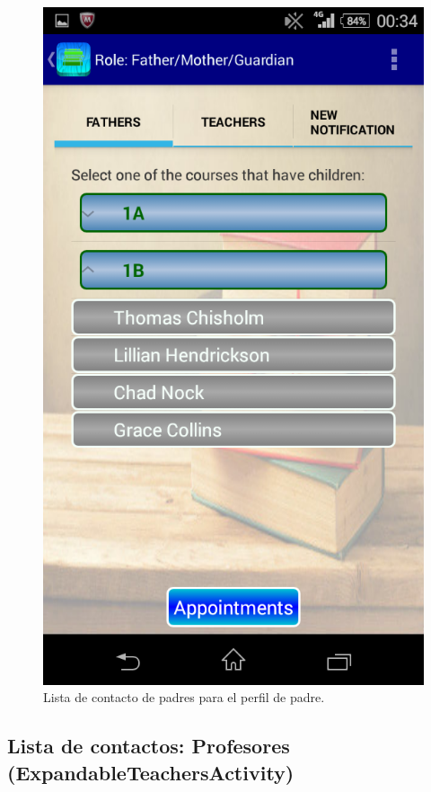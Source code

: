 			\begin{figure}[h !]
				\centering
				\includegraphics[scale=0.2]{Imagenes/App/padrePadre}
				\caption{Lista de contacto de padres para el perfil de padre.}
				\label{fig:padrePadre}
			\end{figure}
		
		\subsection{Lista de contactos: Profesores (ExpandableTeachersActivity)}
		
